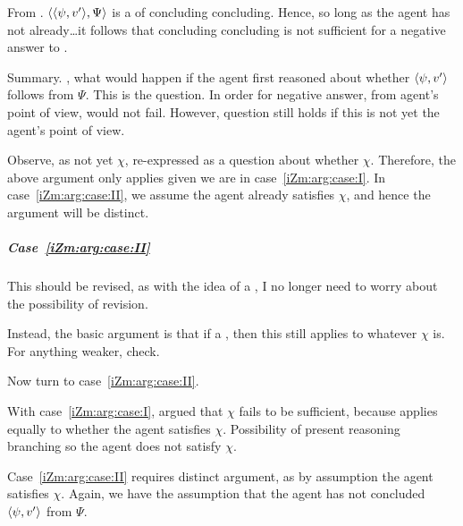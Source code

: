 \begin{note}
  From \izetaSm{}.
  \(\langle \langle \psi, v' \rangle, \Psi \rangle\) is a \requ{} of concluding concluding.
  Hence, so long as the agent has not already\dots it follows that concluding concluding is not sufficient for a negative answer to \qzS{}.
\end{note}

\begin{note}[Summary]
  Summary.
  \qzS{}, what would happen if the agent first reasoned about whether \(\langle \psi, v' \rangle\) follows from \(\Psi\).
  This is the question.
  In order for negative answer, from agent's point of view, would not fail.
  However, question still holds if this is not yet the agent's point of view.
\end{note}

\begin{note}[Observation]
  Observe, as not yet \(\chi\), re-expressed \qzS{} as a question about whether \(\chi\).
  Therefore, the above argument only applies given we are in case~\ref{iZm:arg:case:I}.
  In case~\ref{iZm:arg:case:II}, we assume the agent already satisfies \(\chi\), and hence the argument will be distinct.
\end{note}

\subparagraph*{Case~\ref{iZm:arg:case:II}}

\begin{note}
  {
    \color{red}
    This should be revised, as with the idea of a , I no longer need to worry about the possibility of revision.

    Instead, the basic argument is that if a , then this still applies to whatever \(\chi\) is.
    For anything weaker, check.
  }
\end{note}

\begin{note}
  Now turn to case~\ref{iZm:arg:case:II}.

  With case~\ref{iZm:arg:case:I}, argued that \(\chi\) fails to be sufficient, because \qzS{} applies equally to whether the agent satisfies \(\chi\).
  Possibility of present reasoning branching so the agent does not satisfy \(\chi\).

  Case~\ref{iZm:arg:case:II} requires distinct argument, as by assumption the agent satisfies \(\chi\).
  Again, we have the assumption that the agent has not concluded \(\langle \psi, v' \rangle\) from \(\Psi\).
\end{note}

